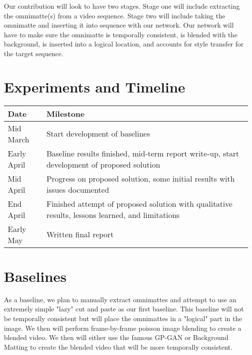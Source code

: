 \documentclass{article}
\begin{document}
Our contribution will look to have two stages. Stage one will include extracting the omnimatte(s) from a video sequence. Stage two will include taking the omnimatte and inserting it into sequence with our network. Our network will have to make sure the omnimatte is temporally consistent, is blended with the background, is inserted into a logical location, and accounts for style transfer for the target sequence.

\section{Experiments and Timeline}
\begin{center}
\begin{tabular}{|| p{2cm} | p{12cm} ||}
    \hline
    \textbf{Date} & \textbf{Milestone} \\
    \hline
    Mid March & Start development of baselines \\
    \hline
    Early April & Baseline results finished, mid-term report write-up, start development of proposed solution \\
    \hline
    Mid April & Progress on proposed solution, some initial results with issues documented \\
    \hline
    End April & Finished attempt of proposed solution with qualitative results, lessons learned, and limitations\\
    \hline
    Early May & Written final report \\
    \hline
\end{tabular}
\end{center}

\section{Baselines}
As a baseline, we plan to manually extract omnimattes and attempt to use an extremely simple "lazy" cut and paste as our first baseline. This baseline will not be temporally consistent but will place the omnimattes in a "logical" part in the image. We then will perform frame-by-frame poisson image blending to create a blended video. We then will either use the famous GP-GAN\cite{10.1145/3343031.3350944} or Background Matting \cite{BMSengupta20} to create the blended video that will be more temporally consistent.


\printbibliography
\end{document}
